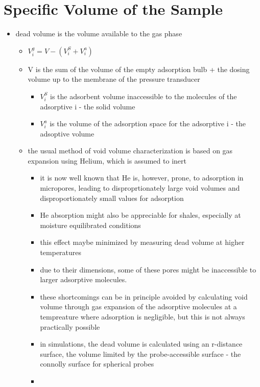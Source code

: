 \documentclass[11pt]{article}
\begin{document}
\section{Specific Volume of the Sample}
\label{sec:orga4d27fe}
\begin{itemize}
\item dead volume is the volume available to the gas phase \cite{Rouquerol2016}
\begin{itemize}
\item \(V _i ^g = V - ( V _i ^S + V _i ^a)\)
\item V is the sum of the volume of the empty adsorption bulb + the dosing volume up to the membrane of the pressure transducer
\begin{itemize}
\item \(V _i ^S\) is the adsorbent volume inaccessible to the molecules of the adsorptive i - the solid volume
\item \(V _i ^a\) is the volume of the adsorption space for the adsorptive i - the adsoptive volume
\end{itemize}
\item the usual method of void volume characterization is based on gas expansion using Helium, which is assumed to inert  
\begin{itemize}
\item it is now well known that He is, however, prone, to adsorption in micropores, leading to disproprtionately large void volumes and disproportionately small values for adsorption \cite{Rouquerol2016}
\item He absorption might also be appreciable for shales, especially at moisture equilibrated conditions
\item this effect maybe minimized by measuring dead volume at higher temperatures \cite{Rouquerol2016}
\item due to their dimensions, some of these pores might be inaccessible to larger adsorptive molecules.
\item these shortcomings can be in principle avoided by calculating void volume through gas expansion of the adsorptive molecules at a tempreature where adsorption is negligible, but this is not always practically possible \cite{Rouquerol2016}
\item in simulations, the dead volume is calculated using an r-distance surface, the volume limited by the probe-accessible surface - the connolly surface for spherical probes \cite{Rouquerol2016}
\item \begin{center}

\end{center}
\end{itemize}
\end{itemize}
\end{itemize}
\end{document}

